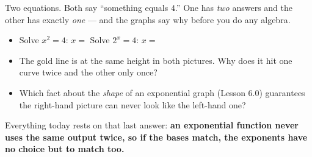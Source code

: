 \documentclass[10pt]{article}
\newcommand{\lgrid}[4]{%
  \draw[step=1, linegray!40, very thin] (#1,#3) grid (#2,#4);
  \draw[->, semithick, charcoal] (#1,0)--(#2,0) node[below right, font=\scriptsize]{$x$};
  \draw[->, semithick, charcoal] (0,#3)--(0,#4) node[left, font=\scriptsize]{$y$};}
\newcommand{\expgraph}[6]{\draw[very thick, forest, domain=#5:#6, samples=140, smooth]
  plot (\x,{(#1)*exp((#2)*((\x)-(#3)))+(#4)});}
\newcommand{\solline}[3]{\draw[goldacc, very thick] (#1,#3)--(#2,#3);}
\begin{document}
\begin{hookbox}
\begin{minipage}{\linewidth}
Two equations. Both say ``something equals $4$.'' One has \emph{two} answers and the other has exactly
\emph{one} --- and the graphs say why before you do any algebra.
\begin{center}
\end{center}
\end{minipage}
\vspace{4pt}
\begin{itemize}\setlength{\itemsep}{1pt}
  \item Solve $x^{2}=4$: \; $x=$  \qquad Solve $2^{x}=4$: \; $x=$ 
  \item The gold line is at the same height in both pictures. Why does it hit one curve twice and the other only once? 
  \item Which fact about the \emph{shape} of an exponential graph (Lesson 6.0) guarantees the right-hand picture can never look like the left-hand one? 
\end{itemize}
Everything today rests on that last answer: \textbf{an exponential function never uses the same output
twice, so if the bases match, the exponents have no choice but to match too.}
\end{hookbox}
\end{document}
